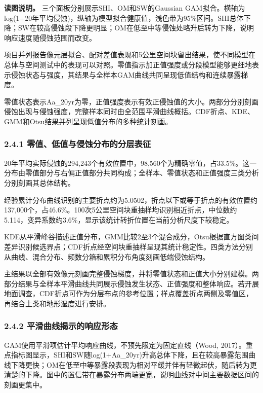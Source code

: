 \documentclass[
  11pt,
  a4paper,
]{ctexart}
\begin{document}
\textbf{读图说明。} 三个面板分别展示SHI、OM和SW的Gaussian
GAM拟合。横轴为log(1+20年平均侵蚀)，纵轴为模型拟合健康值，浅色带为95\%区间。SHI总体下降；SW在较高侵蚀段下降更明显；OM在低至中等侵蚀处略升后转为下降，说明响应速度随侵蚀范围而改变。

项目并列报告像元层拟合、配对差值表现和5公里空间块留出结果，使不同模型在总体与空间测试中的表现可以对照。零值指示加正值强度或分段模型能够更细地表示侵蚀状态与强度，其结果与全样本GAM曲线共同呈现低值结构和连续暴露梯度。

零值状态表示Aa\_20yr为零，正值强度表示有效正侵蚀值的大小。两部分分别刻画侵蚀出现与侵蚀强度，完整样本同时由全范围平滑曲线概括。CDF折点、KDE、GMM和Otsu结果并列呈现低值分布的多种统计刻画。

\hypertarget{ux96f6ux503cux4f4eux503cux4e0eux4fb5ux8680ux5206ux5e03ux7684ux5206ux5c42ux8868ux5f81}{%
\subsubsection{2.4.1
零值、低值与侵蚀分布的分层表征}\label{ux96f6ux503cux4f4eux503cux4e0eux4fb5ux8680ux5206ux5e03ux7684ux5206ux5c42ux8868ux5f81}}

20年平均实际侵蚀的294,243个有效位置中，98,560个为精确零值，占33.5\%。这一分布由零值部分与右偏正值部分共同构成；全样本、零值状态和正值强度三类分析分别刻画其总体结构。

经验累计分布曲线识别的主要折点约为5.0502，折点以下或等于折点的有效位置约137,000个，占46.6\%。100次5公里空间块重抽样均识别相近折点，中位数约5.114，变异系数约3.6\%，显示该统计转折位置在当前分析尺度下较稳定。

KDE从平滑峰谷描述正值分布，GMM比较2至3个混合成分，Otsu根据直方图类间差异识别候选界点；CDF折点经空间块重抽样呈现其统计稳定性。四类方法分别从曲线、混合分布、频数分箱和累积分布角度刻画低端侵蚀结构。

主结果以全部有效像元刻画完整侵蚀梯度，并将零值状态和正值大小分别建模。两部分结果与全样本平滑曲线共同展示侵蚀发生状态、正值强度和整体响应。若开展地面调查，CDF折点可作为分层布点的参考位置；样点覆盖折点两侧及零值区，再结合土类和地形湿度进行安排。

\hypertarget{ux5e73ux6ed1ux66f2ux7ebfux63edux793aux7684ux54cdux5e94ux5f62ux6001}{%
\subsubsection{2.4.2
平滑曲线揭示的响应形态}\label{ux5e73ux6ed1ux66f2ux7ebfux63edux793aux7684ux54cdux5e94ux5f62ux6001}}

GAM使用平滑项估计平均响应曲线，不预先限定为固定直线（Wood,
2017）。重点指标图显示，SHI和SW随log(1+Aa\_20yr)升高总体下降，且在较高暴露范围曲线下降更快；OM在低至中等暴露段表现为相对平缓并伴有轻微起伏，随后转为更清楚的下降。图中的置信带在暴露分布两端更宽，说明曲线对中间主要数据区间的刻画更集中。
\end{document}

